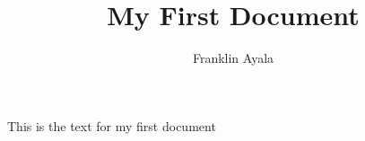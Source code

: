 \documentclass{article}
\title{My First Document}
\author{Franklin Ayala}
\date{}
\begin{document}
\maketitle

This is the text for my first document
\end{document}
